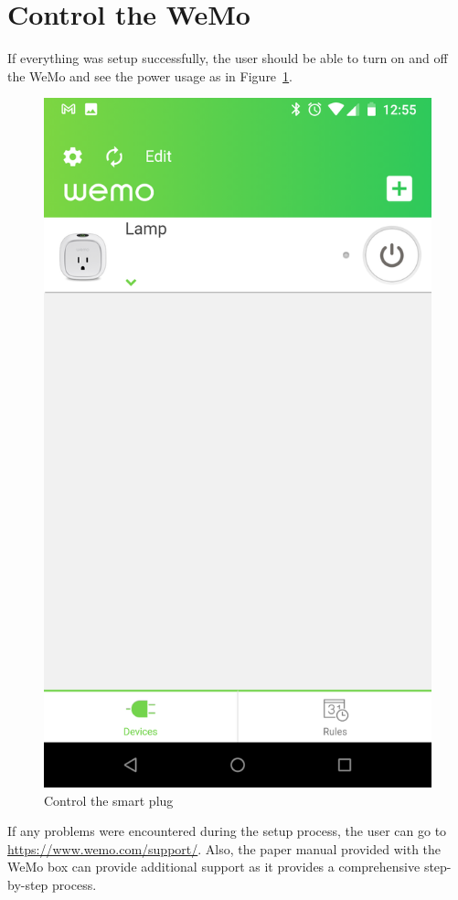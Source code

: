 \section{Control the WeMo}
If everything was setup successfully, the user should be able to turn on and off the WeMo and see the power usage as in Figure~\ref{fig:smartPlutControl}.
\begin{figure}[H]
\centering
\includegraphics[scale=0.09]{figs/wemoApp/wemoAppControl.png}
\caption{Control the smart plug}
\label{fig:smartPlutControl}
\end{figure}

If any problems were encountered during the setup process, the user can go to\\
\href{https://www.wemo.com/support/}{https://www.wemo.com/support/}. Also, the paper manual provided with the WeMo box can provide additional support as it provides a comprehensive step-by-step process.